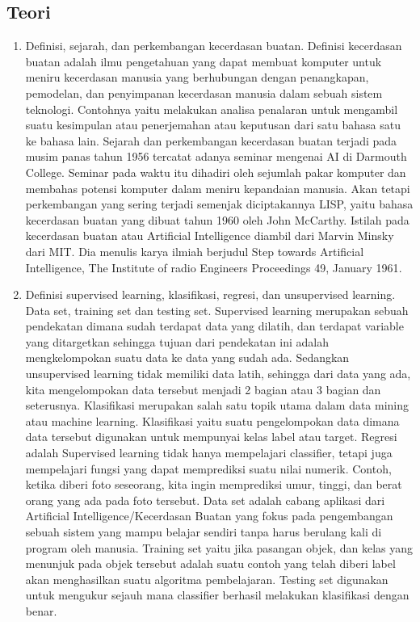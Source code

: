 \subsection{Teori}
\begin{enumerate}
\item Definisi, sejarah, dan perkembangan kecerdasan buatan.
\subitem Definisi kecerdasan buatan adalah ilmu pengetahuan yang dapat membuat komputer untuk meniru kecerdasan manusia yang berhubungan dengan penangkapan, pemodelan, dan penyimpanan kecerdasan manusia dalam sebuah sistem teknologi. Contohnya yaitu melakukan analisa penalaran untuk mengambil suatu kesimpulan atau penerjemahan atau keputusan dari satu bahasa satu ke bahasa lain.
\subitem Sejarah dan perkembangan kecerdasan buatan terjadi pada musim panas tahun 1956 tercatat adanya seminar mengenai AI di Darmouth College. Seminar pada waktu itu dihadiri oleh sejumlah pakar komputer dan membahas potensi komputer dalam meniru kepandaian manusia. Akan tetapi perkembangan yang sering terjadi semenjak diciptakannya LISP, yaitu bahasa kecerdasan buatan yang dibuat tahun 1960 oleh John McCarthy. Istilah pada kecerdasan buatan atau Artificial Intelligence diambil dari Marvin Minsky dari MIT. Dia menulis karya ilmiah berjudul Step towards Artificial Intelligence, The Institute of radio Engineers Proceedings 49, January 1961\cite{baraja2008kecerdasan}. 
\item  Definisi supervised learning, klasifikasi, regresi, dan unsupervised learning. Data set, training set dan testing set. 
\subitem Supervised learning merupakan sebuah pendekatan dimana sudah terdapat data yang dilatih, dan terdapat variable yang ditargetkan sehingga tujuan dari pendekatan ini adalah mengkelompokan suatu data ke data yang sudah ada. Sedangkan unsupervised learning tidak memiliki data latih, sehingga dari data yang ada, kita mengelompokan data tersebut menjadi 2 bagian atau 3 bagian dan seterusnya.
\subitem Klasifikasi merupakan salah satu topik utama dalam data mining atau machine learning. Klasifikasi yaitu suatu pengelompokan data dimana data tersebut digunakan untuk mempunyai kelas label atau target.
\subitem Regresi adalah Supervised learning tidak hanya mempelajari classifier, tetapi juga mempelajari fungsi yang dapat memprediksi suatu nilai numerik. Contoh, ketika diberi foto seseorang, kita ingin memprediksi umur, tinggi, dan berat orang yang ada pada foto tersebut.
\subitem Data set adalah cabang aplikasi dari Artificial Intelligence/Kecerdasan Buatan yang fokus pada pengembangan sebuah sistem yang mampu belajar sendiri tanpa harus berulang kali di program oleh manusia.
\subitem Training set yaitu jika pasangan objek, dan kelas yang menunjuk pada objek tersebut adalah suatu contoh yang telah diberi label akan menghasilkan suatu algoritma pembelajaran.
\subitem Testing set digunakan untuk mengukur sejauh mana classifier berhasil melakukan klasifikasi dengan benar\cite{zhu2009introduction}.
\end{enumerate}
